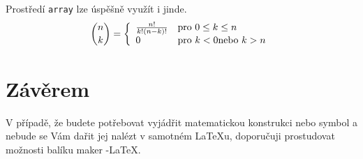 \documentclass[twocolumn,11pt,a4paper]{article}
\begin{document}
Prostředí \texttt{array} lze úspěšně využít i jinde.
\begin{equation*}
    \binom{n}{k} = \left\{
    \begin{array}{l l}
        \frac{n!}{k!(n-k)!} & \textstyle{\textup{pro }} 0\leq k \leq n  \\
        0                   & \textstyle{\textup{pro }} k < 0 \textstyle{\textup{nebo }} k > n
    \end{array}
\right.
\end{equation*}

\section{Závěrem}
V případě, že budete potřebovat vyjádřit matematickou konstrukci nebo symbol a nebude se Vám dařit jej nalézt v samotném \LaTeX u, doporučuji prostudovat možnosti balíku maker \AmS -\LaTeX.
\end{document}
